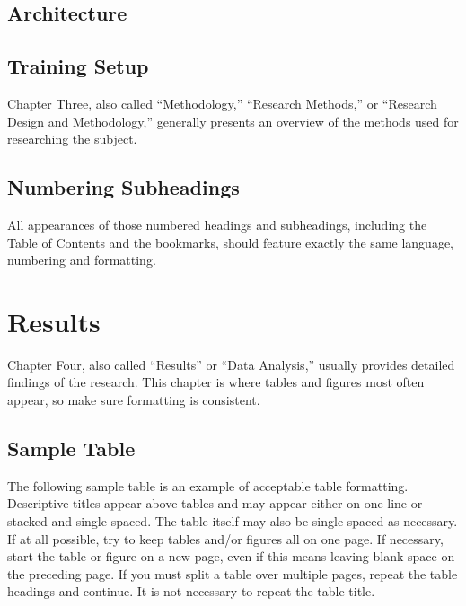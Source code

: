 \documentclass{UCF_ETD}
\begin{document}
\section{Architecture}

\section{Training Setup}

Chapter Three, also called “Methodology,” “Research Methods,” or “Research Design and Methodology,” generally presents an overview of the methods used for researching the subject.

\section{Numbering Subheadings}
All appearances of those numbered headings and subheadings, including the Table of Contents and the bookmarks, should feature exactly the same language, numbering and formatting.






\chapter{Results}
Chapter Four, also called ``Results'' or ``Data Analysis,'' usually provides detailed findings of the research.  This chapter is where tables and figures most often appear, so make sure formatting is consistent.

\section{Sample Table}
The following sample table is an example of acceptable table formatting. Descriptive titles appear above tables and may appear either on one line or stacked and single-spaced. The table itself may also be single-spaced as necessary. If at all possible, try to keep tables and/or figures all on one page. If necessary, start the table or figure on a new page, even if this means leaving blank space on the preceding page. If you must split a table over multiple pages, repeat the table headings and continue. It is not necessary to repeat the table title.
\end{document}
